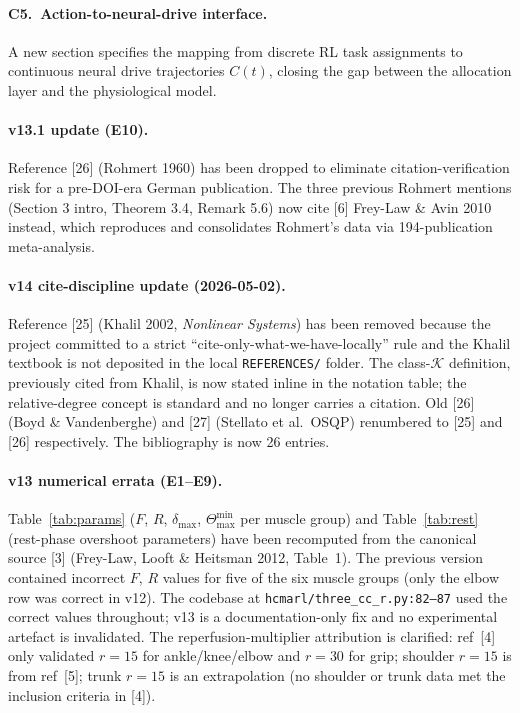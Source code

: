 \documentclass[11pt,a4paper]{article}
\begin{document}
\paragraph{C5.\ Action-to-neural-drive interface.} A new section
specifies the mapping from discrete RL task assignments to continuous
neural drive trajectories $C(t)$, closing the gap between the
allocation layer and the physiological model.

\paragraph{v13.1 update (E10).} Reference [26] (Rohmert 1960) has been
dropped to eliminate citation-verification risk for a pre-DOI-era German
publication. The three previous Rohmert mentions (Section 3 intro,
Theorem 3.4, Remark 5.6) now cite [6] Frey-Law \& Avin 2010 instead,
which reproduces and consolidates Rohmert's data via 194-publication
meta-analysis.

\paragraph{v14 cite-discipline update (2026-05-02).} Reference [25]
(Khalil 2002, \emph{Nonlinear Systems}) has been removed because the
project committed to a strict ``cite-only-what-we-have-locally'' rule
and the Khalil textbook is not deposited in the local
\texttt{REFERENCES/} folder. The class-$\mathcal{K}$ definition,
previously cited from Khalil, is now stated inline in the notation
table; the relative-degree concept is standard and no longer carries
a citation. Old [26] (Boyd \& Vandenberghe) and [27] (Stellato et al.\
OSQP) renumbered to [25] and [26] respectively. The bibliography is
now 26 entries.

\paragraph{v13 numerical errata (E1--E9).} Table~\ref{tab:params}
($F$, $R$, $\delta_{\max}$, $\Theta_{\max}^{\min}$ per muscle group)
and Table~\ref{tab:rest} (rest-phase overshoot parameters) have been
recomputed from the canonical source [3] (Frey-Law, Looft \& Heitsman
2012, Table~1). The previous version contained incorrect $F$, $R$
values for five of the six muscle groups (only the elbow row was
correct in v12). The codebase at
\texttt{hcmarl/three\_cc\_r.py:82--87} used the correct values
throughout; v13 is a documentation-only fix and no experimental
artefact is invalidated. The reperfusion-multiplier attribution is
clarified: ref~[4] only validated $r=15$ for ankle/knee/elbow and
$r=30$ for grip; shoulder $r=15$ is from ref~[5]; trunk $r=15$ is an
extrapolation (no shoulder or trunk data met the inclusion criteria
in [4]).
\end{document}
